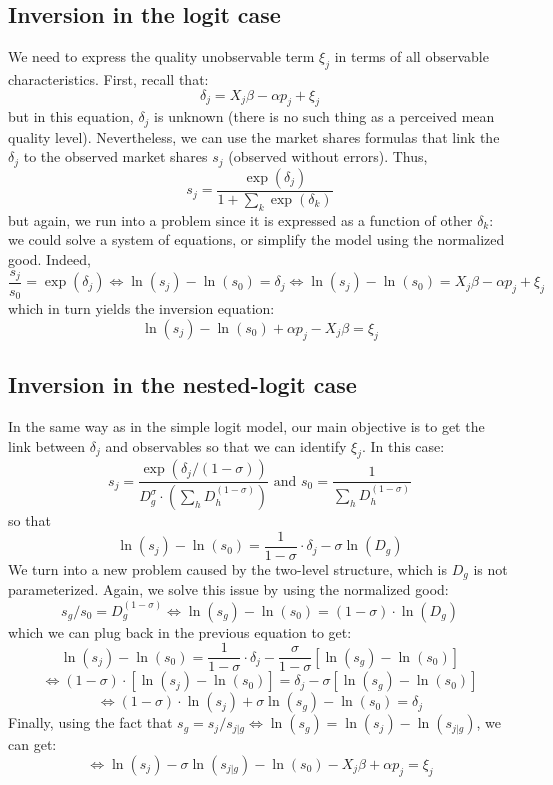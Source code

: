 \subsection{Inversion in the logit case}

We need to express the quality unobservable term $\xi_j$ in terms of all observable characteristics. First, recall that: $$ \delta_j = X_j\beta - \alpha p_j + \xi_j $$ but in this equation, $\delta_j$ is unknown (there is no such thing as a perceived mean quality level). Nevertheless, we can use the market shares formulas that link the $\delta_j$ to the observed market shares $s_j$ (observed without errors). Thus, $$s_j = \frac{\exp(\delta_j)}{1 + \sum_k \exp(\delta_k) } $$ but again, we run into a problem since it is expressed as a function of other $\delta_k$: we could solve a system of equations, or simplify the model using the normalized good. Indeed, $$\frac{s_j}{s_0} = \exp(\delta_j) \Leftrightarrow \ln(s_j) - \ln(s_0) = \delta_j \Leftrightarrow \ln(s_j) - \ln(s_0) = X_j\beta - \alpha p_j + \xi_j $$ which in turn yields the inversion equation: $$
\ln(s_j) - \ln(s_0) +  \alpha p_j  - X_j\beta = \xi_j $$

\subsection{Inversion in the nested-logit case}

In the same way as in the simple logit model, our main objective is to get the link between $\delta_j$ and observables so that we can identify $\xi_j$. In this case: $$s_j = \frac{\exp(\delta_j/(1-\sigma))}{D_g^\sigma\cdot\left(\sum_{h} D_h^{(1-\sigma)}\right)} \text{ and } s_0 = \frac{1}{\sum_{h} D_h^{(1-\sigma)}} $$ so that $$\ln(s_j) - \ln(s_0) = \frac{1}{1-\sigma}\cdot \delta_j - \sigma\ln(D_g) $$ We turn into a new problem caused by the two-level structure, which is $D_g$ is not parameterized. Again, we solve this issue by using the normalized good: $$ s_g / s_0 = D_g^{(1-\sigma)} \Leftrightarrow \ln(s_g) - \ln(s_0) = (1-\sigma) \cdot \ln(D_g) $$ which we can plug back in the previous equation to get: $$\ln(s_j) - \ln(s_0) = \frac{1}{1-\sigma}\cdot \delta_j - \frac{\sigma}{1 - \sigma} [ \ln(s_g) - \ln(s_0) ] $$ $$\Leftrightarrow (1 - \sigma) \cdot [\ln(s_j) - \ln(s_0)] = \delta_j - \sigma [ \ln(s_g) - \ln(s_0) ] $$ $$\Leftrightarrow (1 - \sigma) \cdot \ln(s_j) + \sigma \ln(s_g) - \ln(s_0) = \delta_j $$ Finally, using the fact that $s_g = s_j / s_{j\vert g} \Leftrightarrow \ln(s_g) = \ln(s_j) - \ln(s_{j\vert g})$, we can get: $$\Leftrightarrow \ln(s_j) - \sigma \ln(s_{j\vert g}) - \ln(s_0) - X_j\beta + \alpha p_j = \xi_j $$

